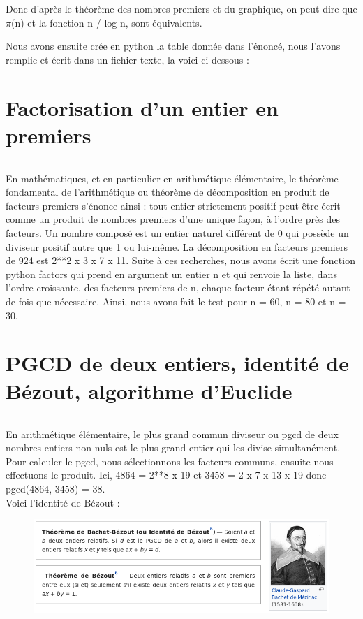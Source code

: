 \documentclass{article}
\begin{document}
$$ $$
$$ $$
$$ $$
$$ $$
$$ $$
$$ $$

Donc d'après le théorème des nombres premiers et du graphique, on peut dire que $\pi$(n) et la fonction n / log n, sont équivalents.
\newline
\newline

Nous avons ensuite crée en python la table donnée dans l'énoncé, nous l'avons remplie et écrit dans un fichier texte, la voici ci-dessous :
$$ $$

\section{Factorisation d'un entier en premiers}
$$ $$

En mathématiques, et en particulier en arithmétique élémentaire, le théorème fondamental de l'arithmétique ou théorème de décomposition en produit de facteurs premiers s'énonce ainsi : tout entier strictement positif peut être écrit comme un produit de nombres premiers d'une unique façon, à l'ordre près des facteurs.
\newline
Un nombre composé est un entier naturel différent de 0 qui possède un diviseur positif autre que 1 ou lui-même. La décomposition en facteurs premiers de 924 est 2**2 x 3 x 7 x 11.
\newline
Suite à ces recherches, nous avons écrit une fonction python factors qui prend en argument un entier n et qui renvoie la liste, dans l'ordre croissante, des facteurs premiers de n, chaque facteur étant répété autant de fois que nécessaire. Ainsi, nous avons fait le test pour n = 60, n = 80 et n = 30.
$$ $$

\section{PGCD de deux entiers, identité de Bézout, algorithme d'Euclide}
$$ $$

En arithmétique élémentaire, le plus grand commun diviseur ou pgcd de deux nombres entiers non nuls est le plus grand entier qui les divise simultanément.
Pour calculer le pgcd, nous sélectionnons les facteurs communs, ensuite nous effectuons le produit. Ici, 4864 = 2**8 x 19 et 3458 = 2 x 7 x 13 x 19 donc pgcd(4864, 3458) = 38.
$$ $$
Voici l'identité de Bézout :

\begin{figure}
        \centering
        \includegraphics[width=1\textwidth]{bezout.png}
\end{figure}
\end{document}
